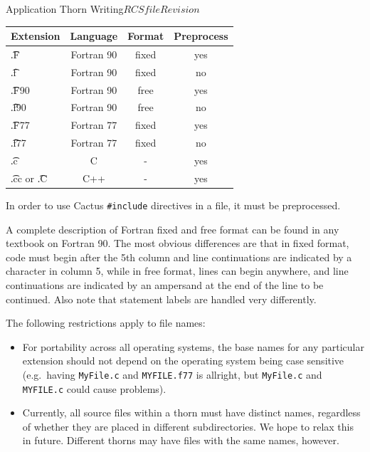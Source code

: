 \begin{cactuspart}{Application Thorn Writing}{$RCSfile$}{$Revision$}
\begin{center}
\begin{tabular}{|l|c|c|c|}
\hline
Extension           & Language   & Format & Preprocess \\
\hline
{\t .F}             & Fortran 90 & fixed  & yes \\
{\t .f}             & Fortran 90 & fixed  & no  \\
{\t .F90}           & Fortran 90 & free   & yes \\
{\t .f90}           & Fortran 90 & free   & no  \\
{\t .F77}           & Fortran 77 & fixed  & yes \\
{\t .f77}           & Fortran 77 & fixed  & no  \\
{\t .c}             & C          & -      & yes \\
{\t .cc} or {\t .C} & C++        & -      & yes \\
\hline
\end{tabular}
\end{center}

In order to use Cactus \texttt{\#include} directives in a file, it must be
preprocessed.

A complete description of Fortran fixed and free format can be found in any
textbook on Fortran 90.  The most obvious differences are that in fixed
format, code must begin after the 5th column and line continuations are
indicated by a character in column 5, while in free format, lines can begin
anywhere, and line continuations are indicated by an ampersand at the end of
the line to be continued.  Also note that statement labels are handled
very differently.

The following restrictions apply to file names:
\begin{itemize}
\item For portability across all operating systems, the base names
        for any particular extension should not depend on the operating
        system being case sensitive (e.g.\ having \texttt{MyFile.c} and
        \texttt{MYFILE.f77} is allright, but \texttt{MyFile.c} and
	\texttt{MYFILE.c} could cause problems).
\item Currently, all source files within a thorn must have distinct names,
regardless of whether they are placed in different subdirectories.  We hope
to relax this in future.  Different thorns may have files with the same names,
however.
\end{itemize}



\end{cactuspart}
